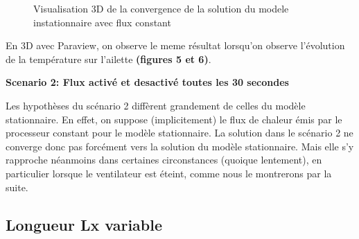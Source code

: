 \documentclass[11pt]{article} %
\begin{document}
\begin{figure}[!htb]
				\qquad
				\caption{Visualisation 3D de la convergence de la solution du modele instationnaire avec flux constant}%
				\label{fig:conv_instat}%
			\end{figure}
\par En 3D avec Paraview, on observe le meme résultat lorsqu’on observe l’évolution de la température sur l’ailette \textbf{(figures 5 et 6)}.
			\begin{center}
				\textbf{Scenario 2: Flux activé et desactivé toutes les 30 secondes}
			\end{center}
\par Les hypothèses du scénario 2 diffèrent grandement de celles du modèle stationnaire. En effet, on suppose (implicitement) le flux de chaleur émis par le processeur constant pour le modèle stationnaire. La solution dans le scénario 2 ne converge donc pas forcément vers la solution du modèle stationnaire. Mais elle s’y rapproche néanmoins dans certaines circonstances (quoique lentement), en particulier lorsque le ventilateur est éteint, comme nous le montrerons par la suite.
	
	\subsection{Longueur Lx variable}
\end{document}

